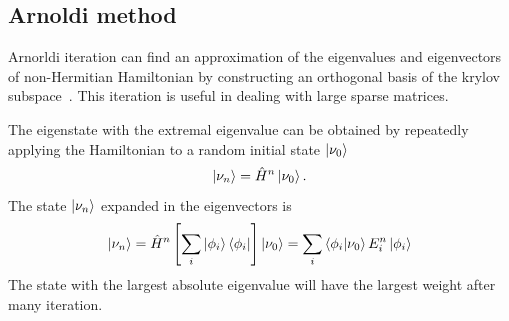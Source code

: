 \documentclass[longbibliography, aps, prx, amsmath, amssymb, amsfonts, twocolumn,superscriptaddress, footinbib]{revtex4-1}
\begin{document}
	
	\subsection{Arnoldi method}

	Arnorldi iteration can find an approximation of the eigenvalues and eigenvectors of non-Hermitian Hamiltonian by constructing an orthogonal basis of the krylov subspace~\cite{arnoldi1951principle}. This iteration is useful in dealing with large sparse matrices. 

	The eigenstate with the extremal eigenvalue can be obtained by repeatedly applying the Hamiltonian to a random initial state $\ket{\nu_0}$
	\begin{equation}
		\ket{\nu_n} = \hat{H}^n \ket{\nu_0}.
	\end{equation}
	The state $\ket{\nu_n}$ expanded in the eigenvectors is 
	\begin{equation}
		\ket{\nu_n} = \hat{H}^n \left[ \sum_i \ket{\phi_i} \bra{\phi_i}\right] \ket{\nu_0} = \sum_i \bra{\phi_i} \ket{\nu_0} E_i^n\ket{\phi_i}
	\end{equation}
	The state with the largest absolute eigenvalue will have the largest weight after many iteration. 
\end{document}
